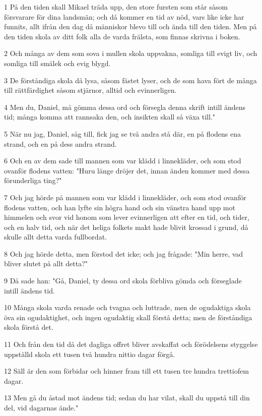 \par 1 På den tiden skall Mikael träda upp, den store fursten som står såsom försvarare för dina landsmän; och då kommer en tid av nöd, vars like icke har funnits, allt ifrån den dag då människor blevo till och ända till den tiden. Men på den tiden skola av ditt folk alla de varda frälsta, som finnas skrivna i boken.
\par 2 Och många av dem som sova i mullen skola uppvakna, somliga till evigt liv, och somliga till smälek och evig blygd.
\par 3 De förståndiga skola då lysa, såsom fästet lyser, och de som hava fört de många till rättfärdighet såsom stjärnor, alltid och evinnerligen.
\par 4 Men du, Daniel, må gömma dessa ord och försegla denna skrift intill ändens tid; många komma att rannsaka den, och insikten skall så växa till."
\par 5 När nu jag, Daniel, såg till, fick jag se två andra stå där, en på flodens ena strand, och en på dess andra strand.
\par 6 Och en av dem sade till mannen som var klädd i linnekläder, och som stod ovanför flodens vatten: "Huru länge dröjer det, innan änden kommer med dessa förunderliga ting?"
\par 7 Och jag hörde på mannen som var klädd i linnekläder, och som stod ovanför flodens vatten, och han lyfte sin högra hand och sin vänstra hand upp mot himmelen och svor vid honom som lever evinnerligen att efter en tid, och tider, och en halv tid, och när det heliga folkets makt hade blivit krossad i grund, då skulle allt detta varda fullbordat.
\par 8 Och jag hörde detta, men förstod det icke; och jag frågade: "Min herre, vad bliver slutet på allt detta?"
\par 9 Då sade han: "Gå, Daniel, ty dessa ord skola förbliva gömda och förseglade intill ändens tid.
\par 10 Många skola varda renade och tvagna och luttrade, men de ogudaktiga skola öva sin ogudaktighet, och ingen ogudaktig skall förstå detta; men de förståndiga skola förstå det.
\par 11 Och från den tid då det dagliga offret bliver avskaffat och förödelsens styggelse uppställd skola ett tusen två hundra nittio dagar förgå.
\par 12 Säll är den som förbidar och hinner fram till ett tusen tre hundra trettiofem dagar.
\par 13 Men gå du åstad mot ändens tid; sedan du har vilat, skall du uppstå till din del, vid dagarnas ände."



